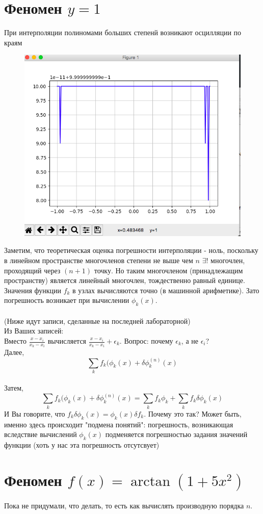 \documentclass[12pt,a4paper]{article}
\begin{document}
\newpage
\section{Феномен $y = 1$}
При интерполяции полиномами больших степенй возникают осцилляции по краям \\
\begin{figure}
	\includegraphics[width=\linewidth]{const_func.png}
	\caption{}
	\label{fig:const}
\end{figure} 
Заметим, что теоретическая оценка погрешности интерполяции - ноль, поскольку в линейном пространстве многочленов степени не выше чем $n$ $\exists!$ многочлен, проходящий через $(n+1)$ точку. Но таким многочленом (принадлежащим пространству) является линейный многочлен, тождественно равный единице. \\
Значения функции $f_k$ в узлах вычисляются точно (в машинной арифметике). Зато погрешность возникает при вычислении $\phi_k(x)$. \\ \\
(Ниже идут записи, сделанные на последней лабораторной) \\
Из Ваших записей: \\
Вместо $\frac{x - x_i}{x_k - x_i}$ вычисляется $\frac{x - x_i}{x_k - x_i} + \epsilon_k$. Вопрос: почему $\epsilon_k$, а не $\epsilon_i$? \\
Далее,
$$
	\sum_k f_k(\phi_k(x) + \delta\phi_k^{(n)}(x)
$$ \\
Затем, 
$$
\sum_k f_k(\phi_k(x) + \delta\phi_k^{(n)}(x) = \sum_k f_k \phi_k + \sum_k f_k \delta\phi_k(x)
$$
И Вы говорите, что $f_k \delta\phi_k(x) = \phi_k(x) \delta f_k$. Почему это так? Может быть, именно здесь происходит "подмена понятий": погрешность, возникающая вследствие вычислений $\phi_k(x)$ подменяется погрешностью задания значений функции (хоть у нас эта погрешность отсутсвует)
\section{Феномен $f(x) = \arctan(1 + 5x^2)$}
Пока не придумали, что делать, то есть как вычислять производную порядка $n$.
\end{document}
